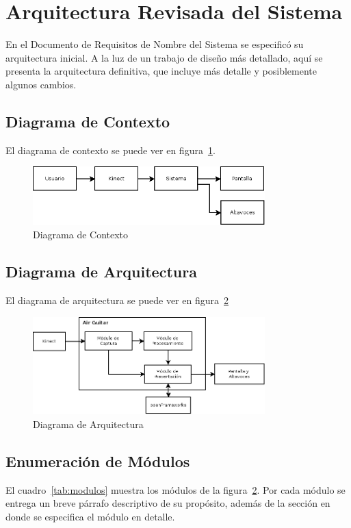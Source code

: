 \documentclass[a4paper,12pt]{article}
\begin{document}
\newpage
\tableofcontents

\listoftables

\listoffigures
\newpage

\section{Arquitectura Revisada del Sistema}
En el Documento de Requisitos de Nombre del Sistema se especificó su
arquitectura inicial. A la luz de un trabajo de diseño más detallado, aquí se
presenta la arquitectura definitiva, que incluye más detalle y posiblemente
algunos cambios.
\subsection{Diagrama de Contexto}
El diagrama de contexto se puede ver en figura~\ref{fig:contexto}.
\begin{figure}[h]
        \centering
        \includegraphics[width=0.8\textwidth]{../imagenes/diagrama_de_contexto.png}
        \caption{Diagrama de Contexto}
        \label{fig:contexto}
\end{figure}

\subsection{Diagrama de Arquitectura}
El diagrama de arquitectura se puede ver en figura~\ref{fig:arquitectura}
\begin{figure}[h]
        \centering
        \includegraphics[width=0.8\textwidth]{../imagenes/diagrama_de_arquitectura.png}
        \caption{Diagrama de Arquitectura}
        \label{fig:arquitectura}
\end{figure}

\subsection{Enumeración de Módulos}
El cuadro~\ref{tab:modulos} muestra los módulos de la
figura~\ref{fig:arquitectura}. Por cada módulo se entrega un breve párrafo
descriptivo de su propósito, además de la sección en donde se especifica el
módulo en detalle.
\end{document}
